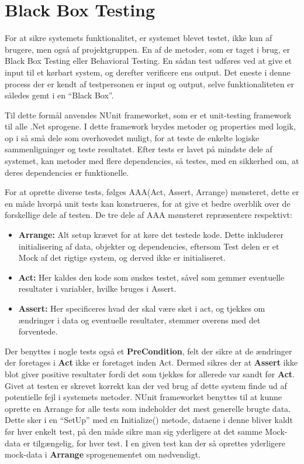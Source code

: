 \section{Black Box Testing}\label{BBtest}
For at sikre systemets funktionalitet, er systemet blevet testet, ikke kun af brugere, men også af projektgruppen.
En af de metoder, som er taget i brug, er Black Box Testing eller Behavioral Testing.
En sådan test udføres ved at give et input til et kørbart system, og derefter verificere ens output.
Det eneste i denne process der er kendt af testpersonen er input og output, selve funktionaliteten er således gemt i en ``Black Box''. \citep{Black_Box}

Til dette formål anvendes NUnit frameworket, som er et unit-testing framework til alle .Net sprogene.
I dette framework brydes metoder og properties med logik, op i så små dele som overhovedet muligt, for at teste de enkelte logiske sammenligninger og teste resultatet.
Efter tests er lavet på mindste dele af systemet, kan metoder med flere dependencies, så testes, med en sikkerhed om, at deres dependencies er funktionelle.
\citep{Unit_Testing}

For at oprette diverse tests, følges AAA(Act, Assert, Arrange) mønsteret, dette er en måde hvorpå unit tests kan konstrueres, for at give et bedre overblik over de forskellige dele af testen.
\citep{Writing_Your_Tests}
De tre dele af AAA mønsteret repræsentere respektivt:
\begin{itemize}
  \item \textbf{Arrange:} Alt setup krævet for at køre det testede kode. Dette inkluderer initialisering af data, objekter og dependencies, eftersom Test delen er et Mock af det rigtige system, og derved ikke er initialiseret.
  \item \textbf{Act:} Her kaldes den kode som ønskes testet, såvel som gemmer eventuelle resultater i variabler, hvilke bruges i Assert.
  \item \textbf{Assert:} Her specificeres hvad der skal være sket i act, og tjekkes om ændringer i data og eventuelle resultater, stemmer overens med det forventede.
\end{itemize}
Der benyttes i nogle tests også et \textbf{PreCondition}, felt der sikre at de ændringer der foretages i \textbf{Act} ikke er foretaget inden Act. 
Dermed sikres der at \textbf{Assert} ikke blot giver positive resultater fordi det som tjekkes for allerede var sandt før \textbf{Act}.
Givet at testen er skrevet korrekt kan der ved brug af dette system finde ud af potentielle fejl i systemets metoder.
NUnit frameworket benyttes til at kunne oprette en Arrange for alle tests som indeholder det mest generelle brugte data.
Dette sker i en ``SetUp'' med en Initialize() metode, dataene i denne bliver kaldt før hver enkelt test, på den måde sikre man sig yderligere at det samme Mock-data er tilgængelig, for hver test.
I en given test kan der så oprettes yderligere mock-data i \textbf{Arrange} sprogenementet om nødvendigt.

